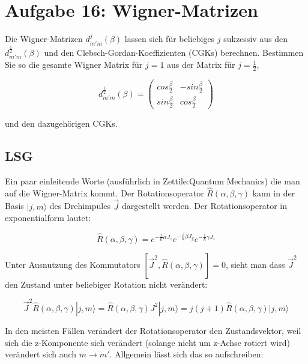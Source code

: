 



\section*{Aufgabe 16: Wigner-Matrizen}

Die Wigner-Matrizen \(d_{m'm}^{j}(\beta)\) lassen sich für beliebiges \(j\) sukzessiv aus den \(d_{m'm}^{\frac{1}{2}}(\beta)\) und den Clebsch-Gordan-Koeffizienten (CGKs) berechnen. Bestimmen Sie so die gesamte Wigner Matrix für \(j=1\) aus der Matrix für \(j=\frac{1}{2}\),

\[d_{m'm}^{\frac{1}{2}}(\beta) =\begin{pmatrix} cos\frac{\beta}{2}&-sin\frac{\beta}{2}\\sin\frac{\beta}{2}&cos\frac{\beta}{2} 
\end{pmatrix}\]




und den dazugehörigen CGKs.


\subsection*{LSG}

Ein paar einleitende Worte (ausführlich in Zettile:Quantum Mechanics) die man auf die Wigner-Matrix kommt. Der Rotationsoperator \(\hat R(\alpha, \beta,\gamma)\) kann in der Basis \(|j,m\rangle\) des Drehimpules \(\vec J\) dargestellt werden. Der Rotationsoperator in exponentialform lautet:

\[  \hat R(\alpha, \beta,\gamma) = e^{-\frac{i}{\hbar}\alpha J_z}  e^{-\frac{i}{\hbar}\beta J_y} e^{-\frac{i}{\hbar}\gamma J_z}\]

Unter Ausnutzung des Kommutators \([\vec J^2,\hat R(\alpha, \beta,\gamma)]=0\), sieht man dass \(\vec J^2\) den Zustand unter beliebiger Rotation nicht verändert:

\[ \vec J^2\hat R(\alpha, \beta,\gamma)|j,m\rangle = \hat R(\alpha, \beta,\gamma)J^2|j,m\rangle = j(j+1)\hat R(\alpha, \beta,\gamma)|j,m\rangle\]

In den meisten Fällen verändert der Rotationsoperator den Zustandsvektor, weil sich die z-Komponente sich verändert (solange nicht um z-Achse rotiert wird) verändert sich auch \(m\rightarrow m'\). Allgemein lässt sich das so aufschreiben:

